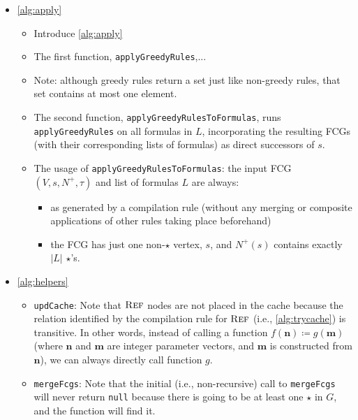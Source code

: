 \begin{itemize}
  \item \cref{alg:apply}
        \begin{itemize}
          \item Introduce \cref{alg:apply}
          \item The first function, \texttt{applyGreedyRules},...
          \item Note: although greedy rules return a set just like non-greedy
                rules, that set contains at most one element.
          \item The second function, \texttt{applyGreedyRulesToFormulas}, runs
                \texttt{applyGreedyRules} on all formulas in $L$, incorporating
                the resulting FCGs (with their corresponding lists of formulas)
                as direct successors of $s$.
          \item The usage of \texttt{applyGreedyRulesToFormulas}: the input FCG
                $(V, s, N^+, \tau)$ and list of formulas $L$ are always:
                \begin{itemize}
                  \item as generated by a compilation rule (without any merging
                        or composite applications of other rules taking place
                        beforehand)
                  \item the FCG has just one non-$\star$ vertex, $s$, and
                        $N^+(s)$ contains exactly $|L|$ $\star$'s.
                \end{itemize}
        \end{itemize}
  \item \cref{alg:helpers}
        \begin{itemize}
          \item \texttt{updCache}: Note that $\operatorname{\textsc{Ref}}$ nodes are not placed in the
                cache because the relation identified by the compilation rule
                for $\operatorname{\textsc{Ref}}$ (i.e., \cref{alg:trycache}) is transitive. In other
                words, instead of calling a function
                $f(\mathbf{n}) \coloneqq g(\mathbf{m})$ (where $\mathbf{n}$ and
                $\mathbf{m}$ are integer parameter vectors, and $\mathbf{m}$ is
                constructed from $\mathbf{n}$), we can always directly call
                function $g$.
          \item \texttt{mergeFcgs}: Note that the initial (i.e., non-recursive)
                call to \texttt{mergeFcgs} will never return \texttt{null}
                because there is going to be at least one $\star$ in $G$, and
                the function will find it.
        \end{itemize}
\end{itemize}

